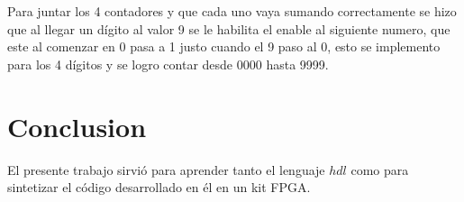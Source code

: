 \documentclass{article}
\begin{document}
Para juntar los 4 contadores y que cada uno vaya sumando correctamente se hizo que al llegar un dígito al valor 9 se le habilita el enable al siguiente numero, que este al comenzar en 0 pasa a 1 justo cuando el 9 paso al 0, esto se implemento para los 4 dígitos y se logro contar desde 0000 hasta 9999.


\section{Conclusion}

El presente trabajo sirvió para aprender tanto el lenguaje \( hdl \) como para sintetizar el código desarrollado en él en un kit FPGA.
\end{document}
